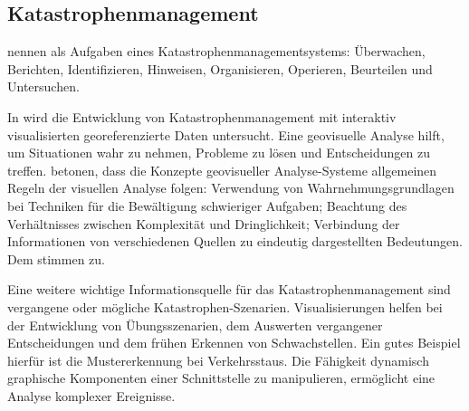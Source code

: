 
\subsection{Katastrophenmanagement}

\cite{yuan_intelligent_2005} nennen als Aufgaben eines Katastrophenmanagementsystems: Überwachen, Berichten, Identifizieren, Hinweisen, Organisieren, Operieren, Beurteilen und Untersuchen.

In \cite{tomaszewski_geovisual_2007} wird die Entwicklung von Katastrophenmanagement mit interaktiv visualisierten georeferenzierte Daten untersucht. Eine geovisuelle Analyse hilft, um Situationen wahr zu nehmen, Probleme zu lösen und Entscheidungen zu treffen. \citep{thomas_illuminating_2005} betonen, dass die Konzepte geovisueller Analyse-Systeme allgemeinen Regeln der visuellen Analyse folgen: Verwendung von Wahrnehmungsgrundlagen bei Techniken für die Bewältigung schwieriger Aufgaben; Beachtung des Verhältnisses zwischen Komplexität und Dringlichkeit; Ver\-bindung der Informationen von verschiedenen Quellen zu eindeutig dargestellten Bedeutungen. Dem stimmen \citeauthor{tomaszewski_geovisual_2007} zu.

Eine weitere wichtige Informationsquelle für das Katastrophenmanagement sind vergangene oder mögliche Katastrophen-Szenarien. Visualisierungen helfen bei der Entwicklung von Übungsszenarien, dem Auswerten vergangener Entscheidungen und dem frühen Erkennen von Schwachstellen. Ein gutes Beispiel hierfür ist die Mustererkennung bei Verkehrsstaus. Die Fähigkeit dynamisch graphische Komponenten einer Schnittstelle zu manipulieren, ermöglicht eine Analyse komplexer Ereignisse. \citep{tomaszewski_geovisual_2007}